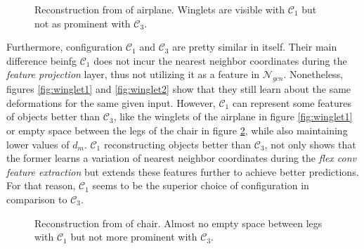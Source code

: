   \begin{figure}[htbp]
    \centering
    \caption{Reconstruction from of airplane. Winglets are visible with $\mathcal{C}_1$ but not as prominent with $\mathcal{C}_3$.} \label{fig:airplanec2}
  \end{figure}

  Furthermore, configuration $\mathcal{C}_1$ and $\mathcal{C}_3$ are pretty similar in itself. Their main difference beinfg $\mathcal{C}_1$ does not 
  incur the nearest neighbor coordinates during the \emph{feature projection} layer, thus not utilizing it as a feature in $\mathcal{N}_{gcn}$.
  Nonetheless, figures \ref{fig:winglet1} and \ref{fig:winglet2} show that they still learn about the same deformations for the same given input. However,
  $\mathcal{C}_1$ can represent some features of objects better than $\mathcal{C}_3$, like the winglets of the airplane in figure \ref{fig:winglet1}
  or empty space between the legs of the chair in figure \ref{fig:chairs}, while also maintaining lower values of $d_m$. $\mathcal{C}_1$ reconstructing
  objects better than $\mathcal{C}_3$, not only shows that the former learns a variation of nearest neighbor coordinates during the
  \emph{flex conv feature extraction} but extends these features further to achieve better predictions. For that reason, $\mathcal{C}_1$ seems to be the 
  superior choice of configuration in comparison to $\mathcal{C}_3$.

  \begin{figure}[htbp]
    \centering
    \caption{Reconstruction from of chair. Almost no empty space between legs with $\mathcal{C}_1$ but not more prominent with $\mathcal{C}_3$.} \label{fig:chairs}
  \end{figure}

